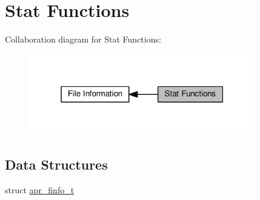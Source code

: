 \hypertarget{group__apr__file__stat}{}\section{Stat Functions}
\label{group__apr__file__stat}
Collaboration diagram for Stat Functions\+:
\nopagebreak
\begin{figure}[H]
\begin{center}
\leavevmode
\includegraphics[width=280pt]{group__apr__file__stat}
\end{center}
\end{figure}
\subsection*{Data Structures}
\begin{DoxyCompactItemize}
\item 
struct \hyperlink{structapr__finfo__t}{apr\+\_\+finfo\+\_\+t}
\end{DoxyCompactItemize}
